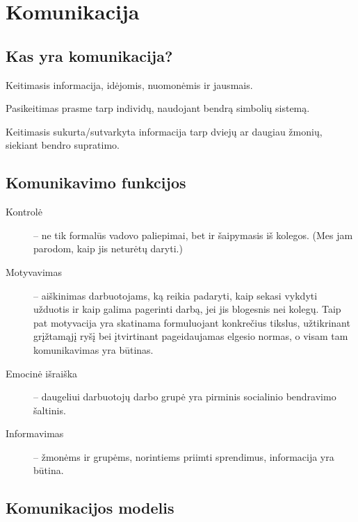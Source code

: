 \chapter{Komunikacija}

\section{Kas yra komunikacija?}

\begin{defn}[Komunikacija]
  Keitimasis informacija, idėjomis, nuomonėmis ir jausmais.
\end{defn}

\begin{defn}[Komunikacija]
  Pasikeitimas prasme tarp individų, naudojant bendrą simbolių sistemą.
\end{defn}

\begin{defn}[Komunikacija]
  Keitimasis sukurta/sutvarkyta informacija tarp dviejų ar daugiau
  žmonių, siekiant bendro supratimo.
\end{defn}

\section{Komunikavimo funkcijos}

\begin{description}
  \item[Kontrolė] – ne tik formalūs vadovo paliepimai, bet ir
    šaipymasis iš kolegos. (Mes jam parodom, kaip jis neturėtų daryti.)
  \item[Motyvavimas] – aiškinimas darbuotojams, ką reikia padaryti,
    kaip sekasi vykdyti užduotis ir kaip galima pagerinti darbą,
    jei jis blogesnis nei kolegų. Taip pat motyvacija yra skatinama
    formuluojant konkrečius tikslus, užtikrinant grįžtamąjį ryšį
    bei įtvirtinant pageidaujamas elgesio normas, o visam
    tam komunikavimas yra būtinas.
  \item[Emocinė išraiška] – daugeliui darbuotojų darbo grupė yra
    pirminis socialinio bendravimo šaltinis.
  \item[Informavimas] – žmonėms ir grupėms, norintiems priimti
    sprendimus, informacija yra būtina.
\end{description}

\section{Komunikacijos modelis}

